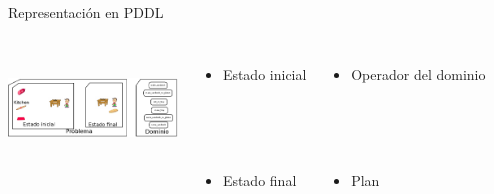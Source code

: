 \documentclass[xcolor=table]{beamer}
\begin{document}
\begin{frame}{Representación en PDDL}
    \begin{columns}
        \includegraphics[width=4.5cm,height=3cm]{childSnack4}
        \begin{itemize}
            \item Estado inicial \\~\\
            \parbox{2in}{\shadowbox{
            
            }} \\~\\
            
            \item Estado final \\~\\
            \parbox{2in}{\shadowbox{
            
            }}
        \end{itemize}
        \begin{itemize}
            \item Operador del dominio \\~\\
            \parbox{2in}{\shadowbox{
            
            }} \\~\\
            \item Plan \\~\\
            \parbox{2in}{\shadowbox{
            
            }}
        \end{itemize}
    \end{columns}
\end{frame}

\end{document}
